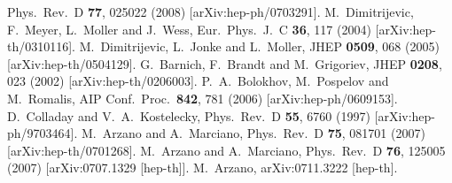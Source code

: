 \documentclass[prl,tightenlines]{revtex4}
\begin{document}
\begin{thebibliography}{99}
  Phys.\ Rev.\  D {\bf 77}, 025022 (2008)
  [arXiv:hep-ph/0703291].
  M.~Dimitrijevic, F.~Meyer, L.~Moller and J.~Wess,
  Eur.\ Phys.\ J.\  C {\bf 36}, 117 (2004)
  [arXiv:hep-th/0310116].
  M.~Dimitrijevic, L.~Jonke and L.~Moller,
  JHEP {\bf 0509}, 068 (2005)
  [arXiv:hep-th/0504129].
  G.~Barnich, F.~Brandt and M.~Grigoriev,
  JHEP {\bf 0208}, 023 (2002)
  [arXiv:hep-th/0206003].
  P.~A.~Bolokhov, M.~Pospelov and M.~Romalis,
  AIP Conf.\ Proc.\  {\bf 842}, 781 (2006)
  [arXiv:hep-ph/0609153].
  D.~Colladay and V.~A.~Kostelecky,
  Phys.\ Rev.\  D {\bf 55}, 6760 (1997)
  [arXiv:hep-ph/9703464].
  M.~Arzano and A.~Marciano,
  Phys.\ Rev.\  D {\bf 75}, 081701 (2007)
  [arXiv:hep-th/0701268].
  M.~Arzano and A.~Marciano,
  Phys.\ Rev.\  D {\bf 76}, 125005 (2007)
  [arXiv:0707.1329 [hep-th]].
  M.~Arzano,
  arXiv:0711.3222 [hep-th].
\end{thebibliography}
\end{document}
